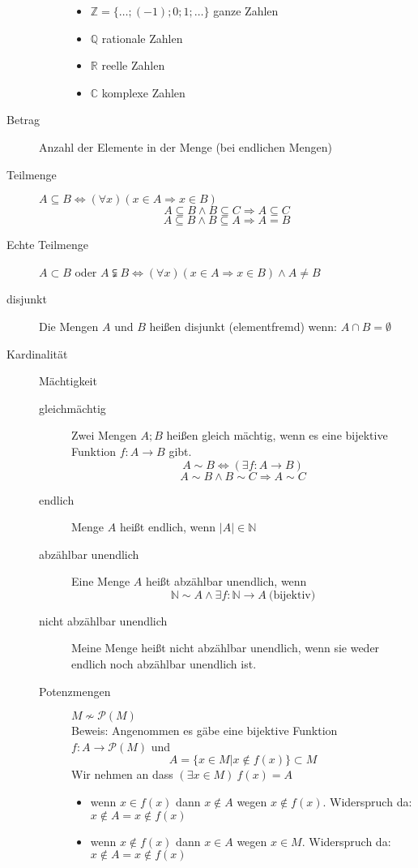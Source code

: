 \begin{description}
\begin{description}
\begin{itemize}
            \item $\mathbb{Z} = \lbrace \dots; (-1);0;1;\dots \rbrace$ ganze Zahlen
            \item $\mathbb{Q}$ rationale Zahlen
            \item $\mathbb{R}$ reelle Zahlen
            \item $\mathbb{C}$ komplexe Zahlen
        \end{itemize}
    \end{description}
    \item[Betrag] Anzahl der Elemente in der Menge (bei endlichen Mengen)
    \item[Teilmenge] $A \subseteq B \Leftrightarrow (\forall x)(x \in A \Rightarrow x \in B)$
    $$A \subseteq B \wedge B \subseteq C \Rightarrow A \subseteq C$$
    $$A \subseteq B \wedge B \subseteq A \Rightarrow A = B$$
    \item[Echte Teilmenge] $A \subset B$ oder $A \subsetneqq B \Leftrightarrow (\forall x)(x \in A \Rightarrow x \in B) \wedge A \not = B $
    \item[disjunkt] Die Mengen $A$ und $B$ heißen disjunkt (elementfremd) wenn: $A \cap B = \emptyset$
    \item[Kardinalität] Mächtigkeit
    \begin{description}
        \item[gleichmächtig] Zwei Mengen $A;B$ heißen gleich mächtig, wenn es eine bijektive Funktion $f : A \longrightarrow B$ gibt.
        $$A \sim B \Leftrightarrow (\exists f : A \longrightarrow B)$$
        $$A \sim B \wedge B \sim C \Rightarrow A \sim C$$
        \item[endlich] Menge $A$ heißt endlich, wenn $|A| \in \mathbb{N}$
        \item[abzählbar unendlich ] Eine Menge $A$ heißt abzählbar unendlich, wenn $$\mathbb{N} \sim A \wedge \exists f : \mathbb{N} \longrightarrow A\ \textrm{(bijektiv)}$$
        \item[nicht abzählbar unendlich] Meine Menge heißt nicht abzählbar unendlich, wenn sie weder endlich noch abzählbar unendlich ist.
        \item[Potenzmengen]$M \not \sim \mathcal{P}(M)$\\ Beweis:
        Angenommen es gäbe eine bijektive Funktion $f : A \longrightarrow \mathcal{P}(M)$ und
        $$A = \lbrace x \in M | x \not \in f(x) \rbrace \subset M$$
        Wir nehmen an dass $(\exists x \in M)\ f(x) = A$
        \begin{itemize}
            \item wenn $x \in f(x) $ dann $x \not \in A$ wegen $x \not \in f(x)$. Widerspruch da: $x \not \in A = x \not \in f(x)$
            \item wenn $x \not \in f(x)$ dann $x \in A$ wegen $x \in M$. Widerspruch da: $x \not \in A = x \not \in f(x)$
        \end{itemize}
    \end{description}
\end{description}
